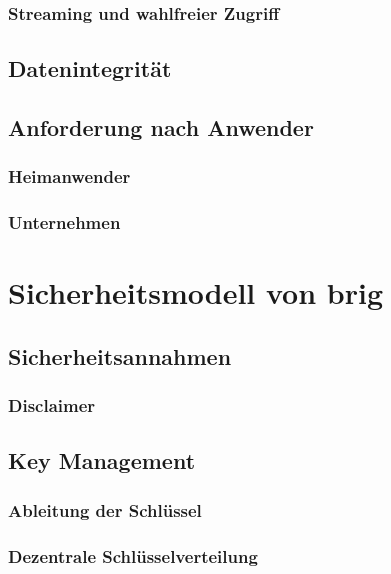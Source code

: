 \documentclass[11pt,ngerman,toc=listof,index=totoc]{scrreprt}
\begin{document}
\subsection{Streaming und wahlfreier
Zugriff}\label{streaming-und-wahlfreier-zugriff}

\section{Datenintegrität}\label{datenintegrituxe4t}

\section{Anforderung nach Anwender}\label{anforderung-nach-anwender}

\subsection{Heimanwender}\label{heimanwender}

\subsection{Unternehmen}\label{unternehmen}

\chapter{Sicherheitsmodell von brig}\label{sicherheitsmodell-von-brig}

\section{Sicherheitsannahmen}\label{sicherheitsannahmen}

\subsection{Disclaimer}\label{disclaimer}

\section{Key Management}\label{key-management}

\subsection{Ableitung der Schlüssel}\label{ableitung-der-schluxfcssel}

\subsection{Dezentrale
Schlüsselverteilung}\label{dezentrale-schluxfcsselverteilung}
\end{document}
